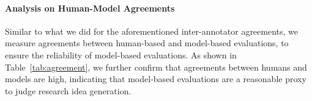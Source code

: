 \documentclass[11pt]{article}
\begin{document}
\begin{table}[t!]
\caption{Results of ablation study on references and entities.}
\vspace{-0.1in}
\label{tab:ablation}
\small
\centering
{}
\vspace{-0.1in}
\end{table}



\paragraph{Analysis on Human-Model Agreements} Similar to what we did for the aforementioned inter-annotator agreements, we measure agreements between human-based and model-based evaluations, to ensure the reliability of model-based evaluations. As shown in Table~\ref{tab:agreement}, we further confirm that agreements between humans and models are high, indicating that model-based evaluations are a reasonable proxy to judge research idea generation. 
\end{document}
